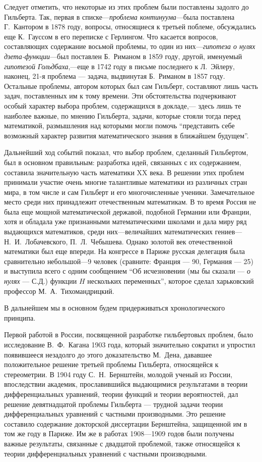 \documentclass[twocolumn,10pt]{article}
\begin{document}
Следует отметить, что некоторые из этих проблем были поставлены задолго до Гильберта. Так, первая в списке---\emph{проблема континуума}---была поставлена Г.~Кантором в 1878 году, вопросы, относящиеся к третьей поблеме, обсуждались еще К.~Гауссом в его переписке с Герлингом. Что касается вопросов, составляющих содержание восьмой проблемы, то один из них---\emph{гипотеза о нулях дзета-функции}---был поставлен Б.~Риманом в 1859 году, другой, именуемый \emph{гипотезой Гольдбаха},---еще в 1742 году в письме последнего к Л.~Эйлеру, наконец, 21-я проблема --- задача, выдвинутая Б.~Риманом в 1857 году. Остальные проблемы, автором которых был сам Гильберт, составляют лишь часть задач, поставленных им к тому времени. Эти обстоятельства подчеркивают особый характер выбора проблем, содержащихся в докладе,--- здесь лишь те наиболее важные, по мнению Гильберта, задачи, которые стояли тогда перед математикой, размышления над которыми могли помочь ``представить себе возможный характер развития математического знания в ближайшем будущем''.

Дальнейший ход событий показал, что выбор проблем, сделанный Гильбертом, был в основном правильным: разработка идей, связанных с их содержанием, составила значительную часть математики XX века. В решении этих проблем принимали участие очень многие талантливые математики из различных стран мира, в том числе и сам Гильберт и его многочисленные ученики. Замечательное место среди них принадлежит отечественным математикам. В то время Россия не была еще мощной математической державой, подобной Германии или Франции, хотя и обладала уже признанными математическими школами и дала миру ряд выдающихся математиков, среди них---величайших математических гениев---Н.~И.~Лобачевского, П.~Л.~Чебышева. Однако золотой век отечественной математики был еще впереди. На конгрессе в Париже русская делегация была сравнительно небольшой---9 человек (сравните: Франция --- 90, Германия --- 25) и выступила всего с одним сообщением ``Об исчезновении (мы бы сказали --- \emph{о нулях} --- С.Д.) функции $H$ нескольких переменных'', которое сделал харьковский профессор М.~А.~Тихомандрицкий.

В дальнейшем мы в основном будем придерживаться хронологического принципа.

Первой работой в России, посвященной разработке гильбертовых проблем, было исследование В.~Ф.~Кагана 1903 года, который значительно сократил и упростил появившееся незадолго до этого доказательство М.~Дена, дававшее положительное решение третьей проблемы Гильберта, относящейся к стереометрии. В 1904 году С.~Н.~Бернштейн, молодой ученый из России, впоследствии академик, прославившийся выдающимися результатами в теории дифференциальных уравнений, теории функций и теории вероятностей, дал решение девятнадцатой проблемы Гильберта --- трудной задачи теории дифференциальных уравнений с частными производными. Это решение составило содержание докторской диссертации Бернштейна, защищенной им в том же году в Париже. Им же в работах 1908---1909 годов были получены важные результаты, связанные с двадцатой проблемой, также относящейся к теории дифференциальных уравнений с частными производными.
\end{document}
